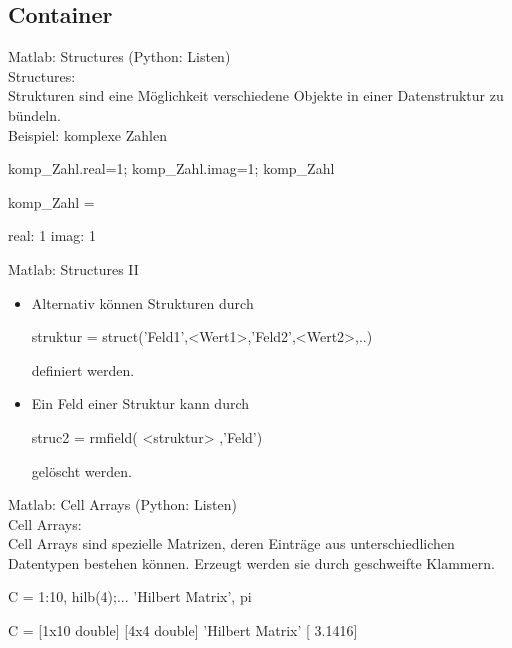 \documentclass[hyperref={xetex}]{beamer}
\begin{document}
\subsection{Container}
%
%
\begin{frame}[fragile]{Matlab: Structures}
(Python: Listen)\\
\alert{Structures:}\\
Strukturen sind eine Möglichkeit verschiedene Objekte in einer
Datenstruktur zu bündeln.\\[1cm]

\alert{Beispiel:} komplexe Zahlen
\begin{matlabin}
komp_Zahl.real=1;
komp_Zahl.imag=1;
komp_Zahl
\end{matlabin}
\begin{matlab}
komp_Zahl = 

    real: 1
    imag: 1
\end{matlab}
\end{frame}
%
%
\begin{frame}[fragile]{Matlab: Structures II}
\begin{itemize}
\item Alternativ können Strukturen durch
\begin{matlabin}
struktur = struct('Feld1',<Wert1>,'Feld2',<Wert2>,..)
\end{matlabin}
definiert werden.
\item Ein Feld einer Struktur  kann durch 
\begin{matlabin}
struc2 = rmfield( <struktur> ,'Feld')
\end{matlabin}
gel\"oscht werden. 
\end{itemize}
\end{frame}
%
%
\begin{frame}[fragile]{Matlab: Cell Arrays}
(Python: Listen)\\
\alert{Cell Arrays:} \\
Cell Arrays sind spezielle Matrizen, deren  Einträge aus unterschiedlichen
Datentypen bestehen können. Erzeugt
werden sie durch geschweifte Klammern.\\
\begin{matlabin}
C = { 1:10, hilb(4);...
       'Hilbert Matrix', pi}
\end{matlabin} 
\begin{matlab}
C = 
       [1x10 double]    [4x4 double]
    'Hilbert Matrix'    [    3.1416]
\end{matlab} 
\end{frame}
\end{document}
